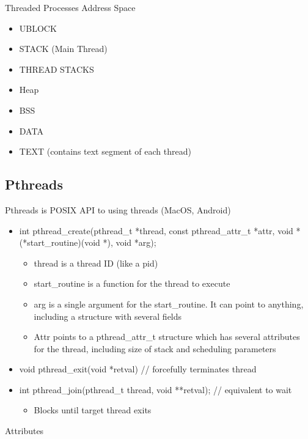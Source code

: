 Threaded Processes Address Space
\begin{itemize}
    \item UBLOCK
    \item STACK (Main Thread)
    \item THREAD STACKS
    \item Heap
    \item BSS
    \item DATA
    \item TEXT (contains text segment of each thread)
\end{itemize}

\subsection{Pthreads}
Pthreads is POSIX API to using threads (MacOS, Android)
\begin{itemize}
    \item int pthread\_create(pthread\_t *thread, const pthread\_attr\_t *attr, void *(*start\_routine)(void *), void *arg);
    \begin{itemize}
        \item thread is a thread ID (like a pid)
        \item start\_routine is a function for the thread to execute
        \item arg is a single argument for the start\_routine. It can point to anything, including a structure with several fields
        \item Attr points to a pthread\_attr\_t structure which has several attributes for the thread, including size of stack and scheduling parameters
    \end{itemize}
    \item void pthread\_exit(void *retval) // forcefully terminates thread
    \item int pthread\_join(pthread\_t thread, void **retval); // equivalent to wait
    \begin{itemize}
        \item Blocks until target thread exits
    \end{itemize}
\end{itemize}
Attributes
